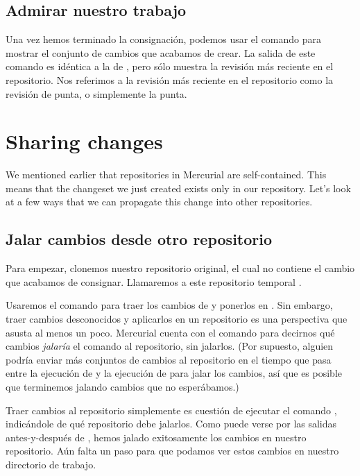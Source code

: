 \subsection{Admirar nuestro trabajo}

Una vez hemos terminado la consignación, podemos usar el comando
 para mostrar el conjunto de cambios que acabamos de crear.
La salida de este comando es idéntica a la de , pero sólo
muestra la revisión más reciente en el repositorio.
Nos referimos a la revisión más reciente en el repositorio como la
revisión de punta, o simplemente la punta.

\section{Sharing changes}

We mentioned earlier that repositories in Mercurial are
self-contained.  This means that the changeset we just created exists
only in our  repository.  Let's look at a few ways
that we can propagate this change into other repositories.

\subsection{Jalar cambios desde otro repositorio}
\label{sec:tour:pull}

Para empezar, clonemos nuestro repositorio  original,
el cual no contiene el cambio que acabamos de consignar. Llamaremos a
este repositorio temporal .

Usaremos el comando  para traer los cambios de
 y ponerlos en .  Sin embargo,
traer cambios desconocidos y aplicarlos en un repositorio es una
perspectiva que asusta al menos un poco.  Mercurial cuenta con el
comando  para decirnos qué
cambios \emph{jalaría} el comando  al repositorio, sin
jalarlos.
(Por supuesto, alguien podría enviar más conjuntos de cambios al
repositorio en el tiempo que pasa entre la ejecución de
 y la ejecución de  para jalar los
cambios, así que es posible que terminemos jalando cambios que no
esperábamos.)

Traer cambios al repositorio simplemente es cuestión de ejecutar el
comando , indicándole de qué repositorio debe jalarlos.
Como puede verse por las salidas antes-y-después de , hemos
jalado exitosamente los cambios en nuestro repositorio. Aún falta un
paso para que podamos ver estos cambios en nuestro directorio de
trabajo.

